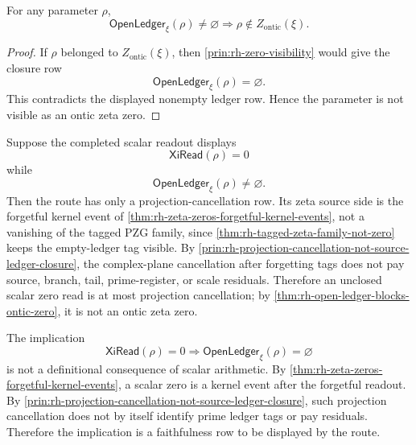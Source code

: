 \begin{theorem}
\label{thm:rh-open-ledger-blocks-ontic-zero}
For any parameter $\rho$,
$$
\mathsf{OpenLedger}_{\xi}(\rho)\ne\varnothing
\Longrightarrow
\rho\notin Z_{\mathrm{ontic}}(\xi).
$$
\end{theorem}

\begin{proof}
If $\rho$ belonged to $Z_{\mathrm{ontic}}(\xi)$, then
\autoref{prin:rh-zero-visibility} would give the closure row
$$
\mathsf{OpenLedger}_{\xi}(\rho)=\varnothing.
$$
This contradicts the displayed nonempty ledger row.  Hence the parameter
is not visible as an ontic zeta zero.
\end{proof}

\begin{principle}
\label{prin:rh-unclosed-zero-reads-projection-cancellation}
Suppose the completed scalar readout displays
$$
\mathsf{XiRead}(\rho)=0
$$
while
$$
\mathsf{OpenLedger}_{\xi}(\rho)\ne\varnothing.
$$
Then the route has only a projection-cancellation row.  Its zeta source
side is the forgetful kernel event of
\autoref{thm:rh-zeta-zeros-forgetful-kernel-events}, not a vanishing of
the tagged PZG family, since
\autoref{thm:rh-tagged-zeta-family-not-zero} keeps the empty-ledger tag
visible.  By
\autoref{prin:rh-projection-cancellation-not-source-ledger-closure}, the
complex-plane cancellation after forgetting tags does not pay source,
branch, tail, prime-register, or scale residuals.  Therefore an
unclosed scalar zero read is at most projection cancellation; by
\autoref{thm:rh-open-ledger-blocks-ontic-zero}, it is not an ontic zeta
zero.
\end{principle}

\begin{principle}
\label{prin:rh-scalar-zero-not-automatically-ledger-closure}
The implication
$$
\mathsf{XiRead}(\rho)=0
\Longrightarrow
\mathsf{OpenLedger}_{\xi}(\rho)=\varnothing
$$
is not a definitional consequence of scalar arithmetic.  By
\autoref{thm:rh-zeta-zeros-forgetful-kernel-events}, a scalar zero is a
kernel event after the forgetful readout.  By
\autoref{prin:rh-projection-cancellation-not-source-ledger-closure}, such
projection cancellation does not by itself identify prime ledger tags or
pay residuals.  Therefore the implication is a faithfulness row to be
displayed by the route.
\end{principle}

